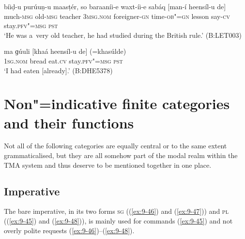 \begin{exe}
\ex
\label{ex:9-43}
\gll bíiḍ-u purúuṇ-u maasṭér, so baraaníi-e waxt-íi-e sabáq [man-í heensíl-u de] \\
much-\textsc{msg} old-\textsc{msg} teacher 3\textsc{msg.nom}  foreigner-\textsc{gn}
time-\textsc{ob"=gn} lesson say-\textsc{cv} stay.\textsc{pfv"=msg} \textsc{pst} \\
\glt `He was a~very old teacher, he had studied during the British rule.' (B:LET003)

\ex
\label{ex:9-44}
\gll ma ɡúuli [khaá heensíl-u de] (=khasúlde) \\
\textsc{1sg.nom} bread eat.\textsc{cv} stay.\textsc{pfv"=msg} \textsc{pst}  \\
\glt `I had eaten [already].' (B:DHE5378)
\end{exe}

\section{Non"=indicative finite categories and their functions}
\label{sec:9-2}


Not all of the following categories are equally central or to the same extent grammaticalised, but they are all somehow part of the modal realm within the TMA system and thus deserve to be mentioned together in one place.


\subsection{Imperative}
\label{subsec:9-2-1}

The bare imperative, in its two forms \textsc{sg} ((\ref{ex:9-46}) and (\ref{ex:9-47})) and \textsc{pl (}(\ref{ex:9-45}) and (\ref{ex:9-48})\textsc{)}, is mainly used for commands (\ref{ex:9-45}) and not overly polite requests (\ref{ex:9-46})--(\ref{ex:9-48}).

